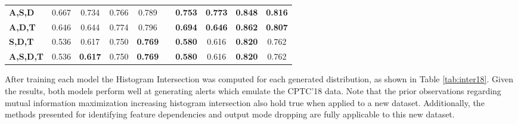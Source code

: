 \begin{table}[!htbp]
\begin{adjustbox}{angle=90}
\begin{tabular}{l|c|c|c|c|c|c|c|c|c|}
			\textbf{A,S,D} & 0.667 & 0.734 & 0.766 & 0.789 &  & \textbf{0.753} & \textbf{0.773} & \textbf{0.848} & \textbf{0.816} \\
			\textbf{A,D,T} & 0.646 & 0.644 & 0.774 & 0.796 &  & \textbf{0.694} & \textbf{0.646} & \textbf{0.862} & \textbf{0.807} \\
			\textbf{S,D,T} & 0.536 & 0.617 & 0.750 & \textbf{0.769} &  & \textbf{0.580} & 0.616 & \textbf{0.820} & 0.762 \\ \hline
			\textbf{A,S,D,T} & 0.536 & \textbf{0.617} & 0.750 & \textbf{0.769} &  & \textbf{0.580} & 0.616 & \textbf{0.820} & 0.762
		\end{tabular}
	\end{adjustbox}
\end{table}


After training each model the Histogram Intersection was computed for each generated distribution, as shown in Table \ref{tab:inter18}. Given the results, both models perform well at generating alerts which emulate the CPTC'18 data. Note that the prior observations regarding mutual information maximization increasing histogram intersection also hold true when applied to a new dataset. Additionally, the methods presented for identifying feature dependencies and output mode dropping are fully applicable to this new dataset.

